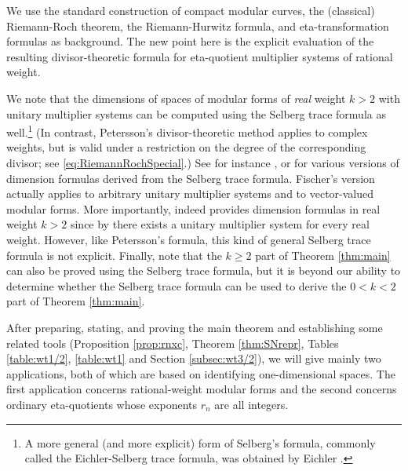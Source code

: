 \documentclass[12pt]{amsart}
\numberwithin{equation}{section}
\theoremstyle{plain}
\theoremstyle{definition}
\theoremstyle{remark}
\begin{document}
We use the standard construction of compact modular curves, the (classical) Riemann-Roch theorem, the Riemann-Hurwitz formula, and eta-transformation formulas as background. The new point here is the explicit evaluation of the resulting divisor-theoretic formula for eta-quotient multiplier systems of rational weight.

We note that the dimensions of spaces of modular forms of \emph{real} weight $k>2$ with unitary multiplier systems can be computed using the Selberg trace formula \cite[p. 84]{Sel56} as well.\footnote{A more general (and more explicit) form of Selberg's formula, commonly called the Eichler-Selberg trace formula, was obtained by Eichler \cite{Eic57}.} (In contrast, Petersson's divisor-theoretic method applies to complex weights, but is valid under a restriction on the degree of the corresponding divisor; see \eqref{eq:RiemannRochSpecial}.) See for instance \cite[p. 481]{Hej83}, \cite[Theorem 2.5.4]{Fis87} or \cite[Theorem 12.4.11]{CS17} for various versions of dimension formulas derived from the Selberg trace formula. Fischer's version actually applies to arbitrary unitary multiplier systems and to vector-valued modular forms. More importantly, \cite[Theorem 2.5.4]{Fis87} indeed provides dimension formulas in real weight $k>2$ since by \cite[Proposition 1.3.6]{Fis87} there exists a unitary multiplier system for every real weight. However, like Petersson's formula, this kind of general Selberg trace formula is not explicit. Finally, note that the $k\geq2$ part of Theorem \ref{thm:main} can also be proved using the Selberg trace formula, but it is beyond our ability to determine whether the Selberg trace formula can be used to derive the $0<k<2$ part of Theorem \ref{thm:main}.

After preparing, stating, and proving the main theorem and establishing some related tools (Proposition \ref{prop:rnxc}, Theorem \ref{thm:SNrepr}, Tables \ref{table:wt1/2}, \ref{table:wt1} and Section \ref{subsec:wt3/2}), we will give mainly two applications, both of which are based on identifying one-dimensional spaces. The first application concerns rational-weight modular forms and the second concerns ordinary eta-quotients whose exponents $r_n$ are all integers.
\end{document}
